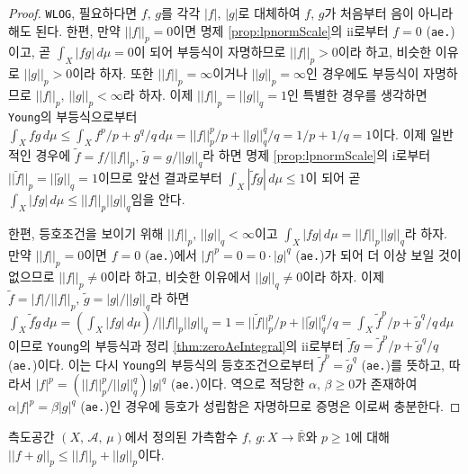 \begin{proof}
    \texttt{WLOG}, 필요하다면 $f,\,g$를 각각 $|f|,\,|g|$로 대체하여 $f,\,g$가 처음부터 음이 아니라 해도 된다. 한편, 만약 $||f||_p=0$이면 명제 \ref{prop:lpnormScale}의 ii로부터 $f=0$ (\texttt{ae.})이고, 곧 $\int_X|fg|\,d\mu=0$이 되어 부등식이 자명하므로 $||f||_p>0$이라 하고, 비슷한 이유로 $||g||_p>0$이라 하자. 또한 $||f||_p=\infty$이거나 $||g||_p=\infty$인 경우에도 부등식이 자명하므로 $||f||_p,\,||g||_p<\infty$라 하자. 이제 $||f||_p=||g||_q=1$인 특별한 경우를 생각하면 \texttt{Young}의 부등식으로부터 $\int_Xfg\,d\mu\leq\int_Xf^p/p+g^q/q\,d\mu=||f||_p^p/p+||g||_q^q/q=1/p+1/q=1$이다. 이제 일반적인 경우에 $\widetilde{f}=f/||f||_p,\,\widetilde{g}=g/||g||_q$라 하면 명제 \ref{prop:lpnormScale}의 i로부터 $||\widetilde{f}||_p=||\widetilde{g}||_q=1$이므로 앞선 결과로부터 $\int_X|\widetilde{f}\widetilde{g}|\,d\mu\leq1$이 되어 곧 $\int_X|fg|\,d\mu\leq||f||_p||g||_q$임을 안다.

    한편, 등호조건을 보이기 위해 $||f||_p,\,||g||_q<\infty$이고 $\int_X|fg|\,d\mu=||f||_p||g||_q$라 하자. 만약 $||f||_p=0$이면 $f=0$ (\texttt{ae.})에서 $|f|^p=0=0\cdot|g|^q$ (\texttt{ae.})가 되어 더 이상 보일 것이 없으므로 $||f||_p\ne0$이라 하고, 비슷한 이유에서 $||g||_q\ne0$이라 하자. 이제 $\widetilde{f}=|f|/||f||_p,\,\widetilde{g}=|g|/||g||_q$라 하면 $\int_X\widetilde{f}\widetilde{g}\,d\mu=(\int_X|fg|\,d\mu)/||f||_p||g||_q=1=||\widetilde{f}||_p^p/p+||\widetilde{g}||_q^q/q=\int_X\widetilde{f}^p/p+\widetilde{g}^q/q\,d\mu$이므로 \texttt{Young}의 부등식과 정리 \ref{thm:zeroAeIntegral}의 ii로부터 $\widetilde{f}\widetilde{g}=\widetilde{f}^p/p+\widetilde{g}^q/q$ (\texttt{ae.})이다. 이는 다시 \texttt{Young}의 부등식의 등호조건으로부터 $\widetilde{f}^p=\widetilde{g}^q$ (\texttt{ae.})를 뜻하고, 따라서 $|f|^p=(||f||_p^p/||g||_q^q)|g|^q$ (\texttt{ae.})이다. 역으로 적당한 $\alpha,\,\beta\geq0$가 존재하여 $\alpha|f|^p=\beta|g|^q$ (\texttt{ae.})인 경우에 등호가 성립함은 자명하므로 증명은 이로써 충분한다.
\end{proof}

\begin{theorem}
    측도공간 $(X,\,\mathcal{A},\,\mu)$에서 정의된 가측함수 $f,\,g:X\to\overline{\mathbb{R}}$와 $p\geq1$에 대해 $||f+g||_p\leq||f||_p+||g||_p$이다.
\end{theorem}

